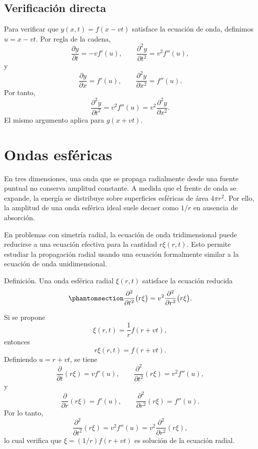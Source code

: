\documentclass[
  letterpaper,
  DIV=11,
  numbers=noendperiod]{scrreprt}
\begin{document}
\subsection{Verificación directa}\label{verificaciuxf3n-directa}

Para verificar que \(y(x,t)=f(x-vt)\) satisface la ecuación de onda,
definimos \(u=x-vt\). Por regla de la cadena, \[
\frac{\partial y}{\partial t}=-v f'(u), \qquad
\frac{\partial^2 y}{\partial t^2}=v^2 f''(u),
\] y \[
\frac{\partial y}{\partial x}=f'(u), \qquad
\frac{\partial^2 y}{\partial x^2}=f''(u).
\] Por tanto, \[
\frac{\partial^2 y}{\partial t^2}=v^2 f''(u)=v^2\frac{\partial^2 y}{\partial x^2}.
\] El mismo argumento aplica para \(g(x+vt)\).

\section{Ondas esféricas}\label{ondas-esfuxe9ricas}

En tres dimensiones, una onda que se propaga radialmente desde una
fuente puntual no conserva amplitud constante. A medida que el frente de
onda se expande, la energía se distribuye sobre superficies esféricas de
área \(4\pi r^2\). Por ello, la amplitud de una onda esférica ideal
suele decaer como \(1/r\) en ausencia de absorción.

En problemas con simetría radial, la ecuación de onda tridimensional
puede reducirse a una ecuación efectiva para la cantidad \(r\xi(r,t)\).
Esto permite estudiar la propagación radial usando una ecuación
formalmente similar a la ecuación de onda unidimensional.

\begin{tcolorbox}[enhanced jigsaw, bottomrule=.15mm, rightrule=.15mm, colframe=quarto-callout-note-color-frame, leftrule=.75mm, breakable, arc=.35mm, toprule=.15mm, left=2mm, colback=white, opacityback=0]

Definición. Una onda esférica radial \(\xi(r,t)\) satisface la ecuación
reducida \begin{equation}\phantomsection\label{eq-spherical-wave}{
\frac{\partial^2}{\partial t^2}\bigl(r\xi\bigr)=v^2\frac{\partial^2}{\partial r^2}\bigl(r\xi\bigr).
}\end{equation}

\end{tcolorbox}

Si se propone \[
\xi(r,t)=\frac{1}{r}f(r+vt),
\] entonces \[
r\xi(r,t)=f(r+vt).
\] Definiendo \(u=r+vt\), se tiene \[
\frac{\partial}{\partial t}(r\xi)=v f'(u), \qquad
\frac{\partial^2}{\partial t^2}(r\xi)=v^2 f''(u),
\] y \[
\frac{\partial}{\partial r}(r\xi)=f'(u), \qquad
\frac{\partial^2}{\partial r^2}(r\xi)=f''(u).
\] Por lo tanto, \[
\frac{\partial^2}{\partial t^2}(r\xi)=v^2 f''(u)=v^2\frac{\partial^2}{\partial r^2}(r\xi),
\] lo cual verifica que \(\xi=(1/r)f(r+vt)\) es solución de la ecuación
radial.
\end{document}
